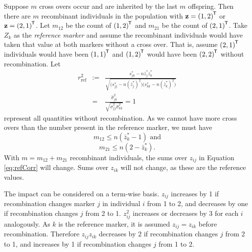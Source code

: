 \documentclass[sts]{imsart}
\newcommand{\ve}[1]{\mathbf{#1}}           %
\newcommand{\tr}[1]{{#1}^{\mkern-1.5mu\mathsf{T}}}              %
\begin{document}
Suppose $m$ cross overs occur and are inherited by the last $m$ offspring. Then there are $m$ recombinant individuals in the population with $\ve{z} = \tr{(1,2)}$ or $\ve{z} = \tr{(2,1)}$. Let $m_{12}$ be the count of $\tr{(1,2)}$ and $m_{21}$ be the count of $\tr{(2,1)}$. Take $Z_k$ as the \emph{reference marker} and assume the recombinant individuals would have taken that value at both markers without a cross over. That is, assume $\tr{(2,1)}$ individuals would have been $\tr{(1,1)}$ and $\tr{(1,2)}$ would have been $\tr{(2,2)}$ without recombination. Let
\begin{eqnarray} 
  r^2_{\text{ref}} & := & \frac{ s_{jk}^* - n \bar{z}_{j}^* \bar{z}_{k}^*}{\sqrt{ \big ( s_{jj}^* - n (\bar{z}_{j}^*)^2 \big ) \big ( s_{kk}^* - n (\bar{z}_{k}^*)^2 \big )}} \label{eq:refCorr} \\
  & = & \frac{\widehat{\sigma}^2_{jk}}{\sqrt{ \widehat{\sigma}^2_{jj} \widehat{\sigma}^2_{kk} }} = 1\nonumber
\end{eqnarray}
represent all quantities without recombination.
As we cannot have more cross overs than the number present in the reference marker, we must have
$$m_{12} \leq n(\bar{z}_k^* - 1) \text{ and}$$
$$m_{21} \leq n(2 - \bar{z}_k^*).$$
With $m = m_{12} + m_{21}$ recombinant individuals, the sums over $z_{ij}$ in Equation \ref{eq:refCorr} will change. Sums over $z_{ik}$ will not change, as these are the reference values.

The impact can be considered on a term-wise basis. $z_{ij}$ increases by 1 if recombination changes marker $j$ in individual $i$ from 1 to 2, and decreases by one if recombination changes $j$ from 2 to 1. $z_{ij}^2$ increases or decreases by 3 for each $i$ analogously. As $k$ is the reference marker, it is assumed $z_{ij} = z_{ik}$ before recombination. Therefore $z_{ij} z_{ik}$ decreases by 2 if recombination changes $j$ from 2 to 1, and increases by 1 if recombination changes $j$ from 1 to 2.
\end{document}
